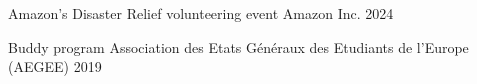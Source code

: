 
\begin{cvcerts}
		
	\cvcert
	{Amazon's Disaster Relief volunteering event} %
	{Amazon Inc.} %
	{} %
	{2024} %

	\cvcert
	{Buddy program} %
	{Association des Etats Généraux des Etudiants de l’Europe (AEGEE)} %
	{} %
	{2019} %

\end{cvcerts}
